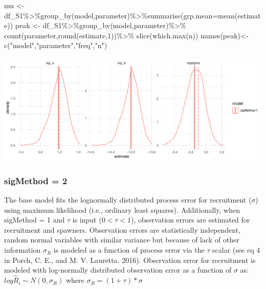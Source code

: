 \documentclass[
]{article}
\newenvironment{Shaded}{\begin{snugshade}}{\end{snugshade}}
\newcommand{\AttributeTok}[1]{\textcolor[rgb]{0.77,0.63,0.00}{#1}}
\newcommand{\DecValTok}[1]{\textcolor[rgb]{0.00,0.00,0.81}{#1}}
\newcommand{\FunctionTok}[1]{\textcolor[rgb]{0.00,0.00,0.00}{#1}}
\newcommand{\NormalTok}[1]{#1}
\newcommand{\OtherTok}[1]{\textcolor[rgb]{0.56,0.35,0.01}{#1}}
\newcommand{\SpecialCharTok}[1]{\textcolor[rgb]{0.00,0.00,0.00}{#1}}
\newcommand{\StringTok}[1]{\textcolor[rgb]{0.31,0.60,0.02}{#1}}
\begin{document}
\begin{Shaded}
\begin{Highlighting}[]
\NormalTok{  mu   }\OtherTok{\textless{}{-}}\NormalTok{ df\_S1}\SpecialCharTok{\%\textgreater{}\%}\FunctionTok{group\_by}\NormalTok{(model,parameter)}\SpecialCharTok{\%\textgreater{}\%}\FunctionTok{summarise}\NormalTok{(}\AttributeTok{grp.mean=}\FunctionTok{mean}\NormalTok{(estimate))}
\NormalTok{  peak }\OtherTok{\textless{}{-}}\NormalTok{ df\_S1}\SpecialCharTok{\%\textgreater{}\%}\FunctionTok{group\_by}\NormalTok{(model,parameter)}\SpecialCharTok{\%\textgreater{}\%}
    \FunctionTok{count}\NormalTok{(parameter,}\FunctionTok{round}\NormalTok{(estimate,}\DecValTok{1}\NormalTok{))}\SpecialCharTok{\%\textgreater{}\%}
    \FunctionTok{slice}\NormalTok{(}\FunctionTok{which.max}\NormalTok{(n))}
  \FunctionTok{names}\NormalTok{(peak)}\OtherTok{\textless{}{-}} \FunctionTok{c}\NormalTok{(}\StringTok{"model"}\NormalTok{,}\StringTok{"parameter"}\NormalTok{,}\StringTok{"freq"}\NormalTok{,}\StringTok{"n"}\NormalTok{)}
\end{Highlighting}
\end{Shaded}

\includegraphics{futR_demo_files/figure-latex/plot1-1.pdf}

\hypertarget{sigmethod-2-1}{%
\subsubsection{sigMethod = 2}\label{sigmethod-2-1}}

The base model fits the lognormally distributed process error for
recruitment (\(\sigma\)) using maximum likelihood (i.e., ordinary least
squares). Additionally, when sigMethod = 1 and \(\tau\) is input
(\(0<\tau<1\)), observation errors are estimated for recruitment and
spawners. Observation errors are statistically independent, random
normal variables with similar variance but because of lack of other
information \(\sigma_R\) is modeled as a function of process error via
the \(\tau\) scalar (see eq 4 in Porch, C. E., and M. V. Lauretta.
2016). Observation error for recruitment is modeled with log-normally
distributed observation error as a function of \(\sigma\) as:
\(log\hat{R}_i\sim N(0,\sigma_R)\) where \(\sigma_R=(1+\tau)*\sigma\)
\end{document}
